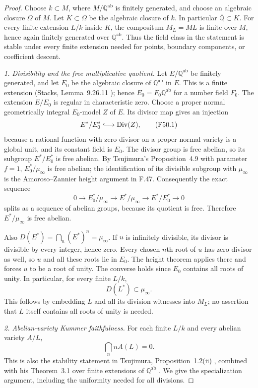 \begin{proof}
Choose $k\subset M$, where $M/\mathbb Q^{\mathrm{ab}}$ is finitely
generated, and choose an algebraic closure $\Omega$ of $M$. Let
$K\subset\Omega$ be the algebraic closure of $k$. In particular
$\overline{\mathbb Q}\subset K$. For every finite extension
$L/k$ inside $K$, the compositum $M_L=ML$ is finite over $M$,
hence again finitely generated over $\mathbb Q^{\mathrm{ab}}$.
Thus the field class in the statement is stable under every finite
extension needed for points, boundary components, or coefficient
descent.

\emph{1. Divisibility and the free multiplicative quotient.}
Let $E/\mathbb Q^{\mathrm{ab}}$ be finitely generated, and let
$E_0$ be the algebraic closure of $\mathbb Q^{\mathrm{ab}}$ in $E$.
This is a finite extension (Stacks, Lemma~9.26.11
\cite{StacksFGConstants}); hence $E_0=F_0\mathbb Q^{\mathrm{ab}}$
for a number field $F_0$. The extension $E/E_0$ is regular in
characteristic zero. Choose a proper normal geometrically integral
$E_0$-model $Z$ of $E$. Its divisor map gives an injection
\[
 E^*/E_0^*\lhook\joinrel\longrightarrow
       \operatorname{Div}(Z),                              \tag{F50.1}
\]
because a rational function with zero divisor on a proper normal
variety is a global unit, and its constant field is $E_0$.
The divisor group is free abelian, so its subgroup $E^*/E_0^*$ is
free abelian. By Tsujimura's Proposition~4.9 with parameter $f=1$,
$E_0^*/\mu_\infty$ is free abelian; the identification of its
divisible subgroup with $\mu_\infty$ is the Amoroso--Zannier
height argument in F.47. Consequently the exact sequence
\[
 0\longrightarrow E_0^*/\mu_\infty
 \longrightarrow E^*/\mu_\infty
 \longrightarrow E^*/E_0^*\longrightarrow0
\]
splits as a sequence of abelian groups, because its quotient is
free. Therefore $E^*/\mu_\infty$ is free abelian.

Also $D(E^*)=\bigcap_n(E^*)^n=\mu_\infty$. If $u$ is infinitely
divisible, its divisor is divisible by every integer, hence zero.
Every chosen $n$th root of $u$ has zero divisor as well, so $u$ and
all these roots lie in $E_0$. The height theorem applies there and
forces $u$ to be a root of unity. The converse holds since $E_0$
contains all roots of unity. In particular, for every finite $L/k$,
\[
               D(L^*)\subset\mu_\infty.                  \tag{F50.2}
\]
This follows by embedding $L$ and all its division witnesses into
$M_L$; no assertion that $L$ itself contains all roots of unity is
needed.

\emph{2. Abelian-variety Kummer faithfulness.}
For each finite $L/k$ and every abelian variety $A/L$,
\[
                    \bigcap_n nA(L)=0.                    \tag{F50.3}
\]
This is also the stability statement in Tsujimura,
Proposition~1.2(ii) \cite{Tsujimura2022}, combined with his
Theorem~3.1 over finite extensions of $\mathbb Q^{\mathrm{ab}}$
\cite{Tsujimura2020}. We give the specialization argument, including
the uniformity needed for all divisions.


\end{proof}
